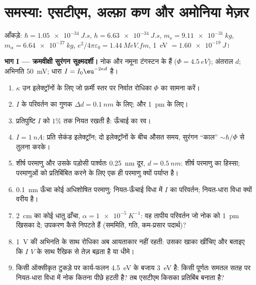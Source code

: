 \section{समस्या: एसटीएम, अल्फ़ा कण और अमोनिया मेज़र}

\begin{problem}[{सप्ताहांत समस्या --- तीन सुरंगें}]\label{pb:b2:potential-wells-tunneling:1}
आँकड़े: $\hbar = \qty{1.05e-34}{J.s}$, $h = \qty{6.63e-34}{J.s}$, $m_{\text{e}} =
\qty{9.11e-31}{kg}$, $m_\alpha = \qty{6.64e-27}{kg}$, $e^2/4\pi\varepsilon_0 =
\qty{1.44}{MeV.fm}$, \qty{1}{eV} $= \qty{1.60e-19}{J}$।

\textbf{भाग I --- क्रमवीक्षी सुरंगन सूक्ष्मदर्शी।}
नोक और नमूना टंगस्टन के हैं ($\Phi = \qty{4.5}{eV}$); अंतराल $d$; अभिनति
\qty{50}{mV}; धारा $I = I_0\eu^{-2\kappa d}$ है।
\begin{enumerate}
  \item $\kappa$ उन इलेक्ट्रॉनों के लिए जो फ़र्मी स्तर पर निर्वात
        रोधिका $\Phi$ का सामना करें।
  \item $I$ के परिवर्तन का गुणक $\Delta d = \qty{0.1}{nm}$ के लिए; और
        \qty{1}{pm} के लिए।
  \item प्रतिपुष्टि $I$ को $1\%$ तक नियत रखती है: ऊँचाई का रव।
  \item $I = \qty{1}{nA}$: प्रति सेकंड इलेक्ट्रॉन; दो इलेक्ट्रॉनों के बीच
        औसत समय, सुरंगन ``काल'' $\sim\hbar/\Phi$ से तुलना करके।
  \item शीर्ष परमाणु और उसके पड़ोसी पार्श्वतः \qty{0.25}{nm} दूर,
        $d = \qty{0.5}{nm}$: शीर्ष परमाणु का हिस्सा; परमाणुओं को प्रतिबिंबित करने के लिए
        एक ही परमाणु क्यों पर्याप्त है।
  \item \qty{0.1}{nm} ऊँचा कोई अधिशोषित परमाणु: नियत-ऊँचाई विधा में
        $I$ का परिवर्तन; नियत-धारा विधा क्यों वरीय है।
  \item \qty{2}{cm} का कोई धातु ढाँचा, $\alpha = \qty{1e-5}{K^{-1}}$: वह तापीय
        परिवर्तन जो नोक को \qty{1}{pm} खिसका दे; उपकरण कैसे
        निपटते हैं (सममिति, गति, कम-प्रसार पदार्थ)?
  \item \qty{1}{V} की अभिनति के साथ रोधिका अब आयताकार नहीं रहती:
        उसका खाका खींचिए और बताइए कि $I$ $V$ के साथ रैखिक से
        तेज़ बढ़ता है या धीमे।
  \item किसी ऑक्सीकृत टुकड़े पर कार्य-फलन \qty{4.5}{eV} के बजाय
        \qty{3}{eV} है: किसी पूर्णतः समतल सतह पर नियत-धारा विधा में
        नोक कितना पीछे हटती है? तब एसटीएम किसका प्रतिबिंब बनाता
        है?
\end{enumerate}


\end{problem}
